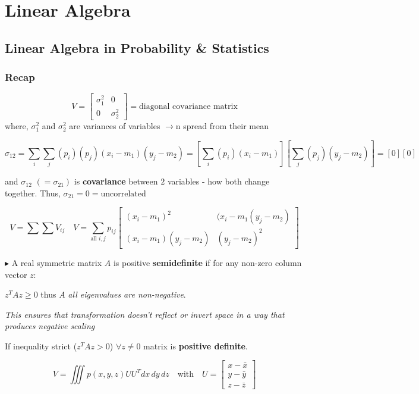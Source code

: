 \documentclass[../Main.tex]{subfiles}
\begin{document}
\chapter{Linear Algebra}

\section{Linear Algebra in Probability \& Statistics}

\subsection{Recap}

\[
V = \begin{bmatrix} \sigma_1^2 & 0 \\ 0 & \sigma_2^2 \end{bmatrix} = \text{diagonal covariance matrix}
\]
where, $\sigma^2_1$ and $\sigma_2^2$ are variances of variables $\rightarrow$n spread from their mean

\[
\sigma_{12} = \sum_i \sum_j (p_i)(p_j)(x_i - m_1)(y_j - m_2) = \left[ \sum_i (p_i)(x_i - m_1) \right] \left[ \sum_j (p_j)(y_j - m_2) \right] = [0][0]
\]

and $\sigma_{12}$ $(=\sigma_{21})$ is \textbf{covariance} between $2$ variables - how both change together. Thus, $\sigma_{21} = 0 = \text{uncorrelated}$

\[
V = \sum \sum V_{ij} \quad V = \sum_{\text{all } i,j} p_{ij} 
\begin{bmatrix} (x_i - m_1)^2 & (x_i - m_1 (y_j - m_2) \\ (x_i - m_1)(y_j - m_2) & (y_j - m_2)^2 \end{bmatrix}
\]

$\blacktriangleright$ A real symmetric matrix $A$ is positive \textbf{semidefinite} if for any non-zero column vector $z$:

$z^T Az \geq 0$ thus $A $ \textit{all eigenvalues are non-negative}.

\textit{This ensures that transformation doesn't reflect or invert space in a way that produces negative scaling}

If inequality strict ($z^TAz>0$) $\forall z\neq 0$ matrix is \textbf{positive definite}. 

\hrulefill

\[
V = \iiint p(x, y, z) U U^T dx \, dy \, dz \quad \text{with} \quad U = \begin{bmatrix} x - \bar{x} \\ y - \bar{y} \\ z - \bar{z} \end{bmatrix}
\]
\end{document}
